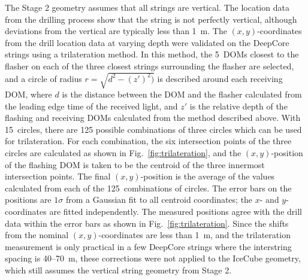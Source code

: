 The Stage 2 geometry assumes that all strings are vertical. The
location data from the drilling process show that the string is not perfectly vertical,
although deviations from the vertical are typically less than 1~m. The
$(x,y)$-coordinates from the drill location data at varying depth were validated on the DeepCore strings
using a trilateration method. In this method, the 5~DOMs closest to the
flasher on each of the three closest strings surrounding the flasher are
selected, and a circle of radius $r = \sqrt{d^2 - (z')^2)}$ is
described around each receiving DOM, where $d$ is the distance between the DOM
and the flasher calculated from the leading edge time of the received
light, and $z'$ is the relative depth of the flashing and receiving
DOMs calculated from the method described above. With 15~circles,
there are 125 possible combinations of three circles which can be used
for trilateration. For each combination, the six intersection points
of the three circles are calculated as shown in
Fig.~\ref{fig:trilateration}, and the $(x,y)$-position of the flashing DOM 
is taken to be the centroid of the three innermost intersection
points. The final $(x,y)$-position is the average of the values
calculated from each of the 125~combinations of circles. The
error bars on the positions are $1 \sigma$ from a Gaussian fit to all centroid
coordinates; the $x$- and $y$-coordinates are fitted independently. The
measured positions agree with the drill data within the error bars as shown in
Fig.~\ref{fig:trilateration}. Since the shifts from the nominal
$(x,y)$-coordinates are less than 1~m, and the trilateration measurement is only
practical in a few DeepCore strings where the interstring spacing is 40--70~m, these
corrections were not applied to the IceCube geometry, which still assumes
the vertical string geometry from Stage 2.


